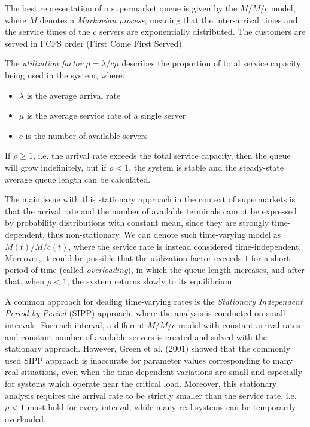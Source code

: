 The best representation of a supermarket queue is given by the \( M/M/c \) model, where \( M \) denotes a \emph{Markovian process}, meaning that the inter-arrival times and the service times of the \( c \) servers are exponentially distributed. The customers are served in FCFS order (First Come First Served).

The \emph{utilization factor} \( \rho = \lambda/c\mu \) describes the proportion of total service capacity being used in the system, where:
\begin{itemize}
  \item \( \lambda \) is the average arrival rate
  \item \( \mu \) is the average service rate of a single server
  \item \( c \) is the number of available servers
\end{itemize}
If \( \rho \ge 1 \), i.e. the arrival rate exceeds the total service capacity, then the queue will grow indefinitely, but if \( \rho < 1 \), the system is stable and the steady-state average queue length can be calculated.

The main issue with this stationary approach in the context of supermarkets is that the arrival rate and the number of available terminals cannot be expressed by probability distributions with constant mean, since they are strongly time-dependent, thus non-stationary. We can denote such time-varying model as \( M(t)/M/c(t) \), where the service rate is instead considered time-independent. Moreover, it could be possible that the utilization factor exceeds \( 1 \) for a short period of time (called \emph{overloading}), in which the queue length increases, and after that, when \( \rho < 1 \), the system returns slowly to its equilibrium.

A common approach for dealing time-varying rates is the \emph{Stationary Independent Period by Period} (SIPP) approach, where the analysis is conducted on small intervals. For each interval, a different \( M/M/c \) model with constant arrival rates and constant number of available servers is created and solved with the stationary approach. However, Green et al. (2001) \cite{green2001} showed that the commonly used SIPP approach is inaccurate for parameter values corresponding to many real situations, even when the time-dependent variations are small and especially for systems which operate near the critical load. Moreover, this stationary analysis requires the arrival rate to be strictly smaller than the service rate, i.e. \( \rho < 1 \) must hold for every interval, while many real systems can be temporarily overloaded.

